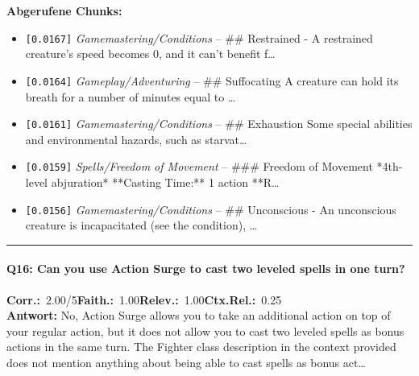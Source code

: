 \noindent\textbf{Abgerufene Chunks:}
\begin{itemize}[noitemsep, topsep=2pt]
  \item[\textbf{\#1}] \texttt{[0.0167]} \textit{Gamemastering/Conditions} -- \#\# Restrained  - A restrained creature's speed becomes 0, and it can't benefit f\ldots
  \item[\textbf{\#2}] \texttt{[0.0164]} \textit{Gameplay/Adventuring} -- \#\# Suffocating  A creature can hold its breath for a number of minutes equal to \ldots
  \item[\textbf{\#3}] \texttt{[0.0161]} \textit{Gamemastering/Conditions} -- \#\# Exhaustion  Some special abilities and environmental hazards, such as starvat\ldots
  \item[\textbf{\#4}] \texttt{[0.0159]} \textit{Spells/Freedom of Movement} -- \#\#\# Freedom of Movement  *4th-level abjuration*  **Casting Time:** 1 action  **R\ldots
  \item[\textbf{\#5}] \texttt{[0.0156]} \textit{Gamemastering/Conditions} -- \#\# Unconscious  - An unconscious creature is incapacitated (see the condition), \ldots
\end{itemize}
\vspace{4pt}
\hrule
\vspace{6pt}

\paragraph{Q16: Can you use Action Surge to cast two leveled spells in one turn?}
\noindent \textbf{Corr.:}~2.00/5\quad \textbf{Faith.:}~1.00\quad \textbf{Relev.:}~1.00\quad \textbf{Ctx.Rel.:}~0.25\\

\noindent\textbf{Antwort:} No, Action Surge allows you to take an additional action on top of your regular action, but it does not allow you to cast two leveled spells as bonus actions in the same turn. The Fighter class description in the context provided does not mention anything about being able to cast spells as bonus act\ldots

